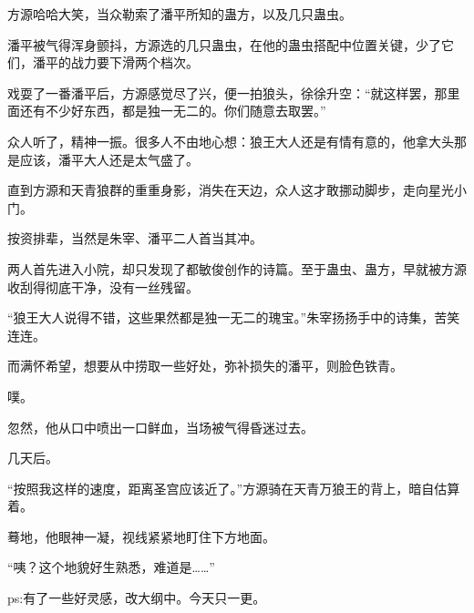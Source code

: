 \begin{this_body}
方源哈哈大笑，当众勒索了潘平所知的蛊方，以及几只蛊虫。

潘平被气得浑身颤抖，方源选的几只蛊虫，在他的蛊虫搭配中位置关键，少了它们，潘平的战力要下滑两个档次。

戏耍了一番潘平后，方源感觉尽了兴，便一拍狼头，徐徐升空：“就这样罢，那里面还有不少好东西，都是独一无二的。你们随意去取罢。”

众人听了，精神一振。很多人不由地心想：狼王大人还是有情有意的，他拿大头那是应该，潘平大人还是太气盛了。

直到方源和天青狼群的重重身影，消失在天边，众人这才敢挪动脚步，走向星光小门。

按资排辈，当然是朱宰、潘平二人首当其冲。

两人首先进入小院，却只发现了都敏俊创作的诗篇。至于蛊虫、蛊方，早就被方源收刮得彻底干净，没有一丝残留。

“狼王大人说得不错，这些果然都是独一无二的瑰宝。”朱宰扬扬手中的诗集，苦笑连连。

而满怀希望，想要从中捞取一些好处，弥补损失的潘平，则脸色铁青。

噗。

忽然，他从口中喷出一口鲜血，当场被气得昏迷过去。

几天后。

“按照我这样的速度，距离圣宫应该近了。”方源骑在天青万狼王的背上，暗自估算着。

蓦地，他眼神一凝，视线紧紧地盯住下方地面。

“咦？这个地貌好生熟悉，难道是……”

ps:有了一些好灵感，改大纲中。今天只一更。

\end{this_body}

